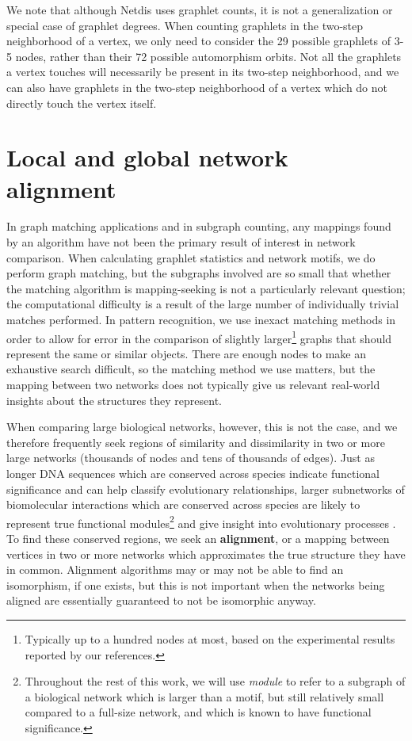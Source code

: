 \documentclass[12pt]{thesis}
\theoremstyle{plain}
\theoremstyle{definition}
\theoremstyle{remark}
\begin{document}
We note that although Netdis uses graphlet counts, it is not a generalization or special case of graphlet degrees. When counting graphlets in the two-step neighborhood of a vertex, we only need to consider the 29 possible graphlets of 3-5 nodes, rather than their 72 possible automorphism orbits.
Not all the graphlets a vertex touches will necessarily be present in its two-step neighborhood, and we can also have graphlets in the two-step neighborhood of a vertex which do not directly touch the vertex itself. 








\section{Local and global network alignment}

In graph matching applications and in subgraph counting, any mappings found by an algorithm have not been the primary result of interest in network comparison. When calculating graphlet statistics and network motifs, we do perform graph matching, but the subgraphs involved are so small that whether the matching algorithm is mapping-seeking is not a particularly relevant question; the computational difficulty is a result of the large number of individually trivial matches performed. In pattern recognition, we use inexact matching methods in order to allow for error in the comparison of slightly larger\footnote{Typically up to a hundred nodes at most, based on the experimental results reported by our references.} graphs that should represent the same or similar objects. There are enough nodes to make an exhaustive search difficult, so the matching method we use matters, but the mapping between two networks does not typically give us relevant real-world insights about the structures they represent.

When comparing large biological networks, however, this is not the case, and we therefore frequently seek regions of similarity and dissimilarity in two or more large networks (thousands of nodes and tens of thousands of edges). Just as longer DNA sequences which are conserved across species indicate functional significance and can help classify evolutionary relationships, larger subnetworks of biomolecular interactions which are conserved across species are likely to represent true functional modules\footnote{Throughout the rest of this work, we will use \textit{module} to refer to a subgraph of a biological network which is larger than a motif, but still relatively small compared to a full-size network, and which is known to have functional significance.}  \cite{Sharan_2006} and give insight into evolutionary processes \cite{Ali_2014}. To find these conserved regions, we seek an \textbf{alignment}, or a mapping between vertices in two or more networks which approximates the true structure they have in common. Alignment algorithms may or may not be able to find an isomorphism, if one exists, but this is not important when the networks being aligned are essentially guaranteed to not be isomorphic anyway.
\end{document}
